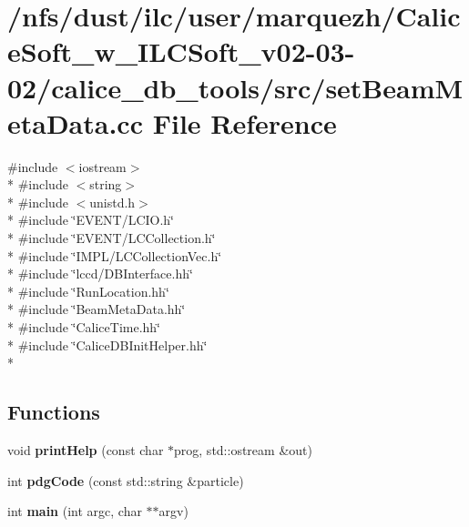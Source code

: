\section{/nfs/dust/ilc/user/marquezh/\-Calice\-Soft\-\_\-w\-\_\-\-I\-L\-C\-Soft\-\_\-v02-\/03-\/02/calice\-\_\-db\-\_\-tools/src/set\-Beam\-Meta\-Data.cc File Reference}
\label{setBeamMetaData_8cc}
{\ttfamily \#include $<$iostream$>$}\\*
{\ttfamily \#include $<$string$>$}\\*
{\ttfamily \#include $<$unistd.\-h$>$}\\*
{\ttfamily \#include \char`\"{}E\-V\-E\-N\-T/\-L\-C\-I\-O.\-h\char`\"{}}\\*
{\ttfamily \#include \char`\"{}E\-V\-E\-N\-T/\-L\-C\-Collection.\-h\char`\"{}}\\*
{\ttfamily \#include \char`\"{}I\-M\-P\-L/\-L\-C\-Collection\-Vec.\-h\char`\"{}}\\*
{\ttfamily \#include \char`\"{}lccd/\-D\-B\-Interface.\-hh\char`\"{}}\\*
{\ttfamily \#include \char`\"{}Run\-Location.\-hh\char`\"{}}\\*
{\ttfamily \#include \char`\"{}Beam\-Meta\-Data.\-hh\char`\"{}}\\*
{\ttfamily \#include \char`\"{}Calice\-Time.\-hh\char`\"{}}\\*
{\ttfamily \#include \char`\"{}Calice\-D\-B\-Init\-Helper.\-hh\char`\"{}}\\*
\subsection*{Functions}
\begin{DoxyCompactItemize}
\item 
void {\bfseries print\-Help} (const char $\ast$prog, std\-::ostream \&out)\label{setBeamMetaData_8cc_a916a9682d2523299f47f4ac23e667f0e}

\item 
int {\bfseries pdg\-Code} (const std\-::string \&particle)\label{setBeamMetaData_8cc_abe678018135d49693e872c96684df4d4}

\item 
int {\bfseries main} (int argc, char $\ast$$\ast$argv)\label{setBeamMetaData_8cc_a3c04138a5bfe5d72780bb7e82a18e627}

\end{DoxyCompactItemize}



